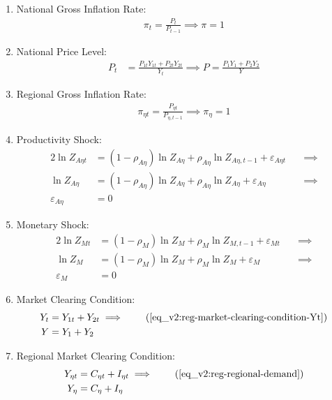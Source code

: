 \documentclass[../thesis.tex]{subfiles}
\begin{document}
\begin{enumerate}
	\item National Gross Inflation Rate:
	\begin{align}
		\pi_t = \frac{P_t}{P_{t-1}} \implies \pi = 1 \label{eq_v2:reg-ss-gross-inflation-rate}
	\end{align}
	
	\item National Price Level:
	\begin{align}
		P_t &= \frac{P_{1t} Y_{1t} + P_{2t} Y_{2t}}{Y_{t}} \implies P = \frac{P_{1} Y_{1} + P_{2} Y_{2}}{Y_{}} \label{eq_v2:ss-national-price-level} %
	\end{align}
	
	\item Regional Gross Inflation Rate:
	\begin{align}
		\pi_{\eta t} = \frac{P_{\eta t}}{P_{\eta, t-1}} \implies \pi_{\eta} = 1 \label{eq_v2:ss-regional-inflation}
	\end{align}
	
	\item Productivity Shock:
	\begin{alignat}{2}
		\ln{Z_{A\eta t}} &= (1 -\rho_{A\eta}) \ln{Z_{A\eta}} + \rho_{A\eta} \ln{Z_{A\eta,t-1}} + \varepsilon_{A\eta t} \quad &\implies \nonumber \\
		\ln{Z_{A\eta}} &= (1 -\rho_{A\eta}) \ln{Z_{A\eta}} + \rho_{A\eta} \ln{Z_{A\eta}} + \varepsilon_{A\eta} &\implies \nonumber \\
		\varepsilon_{A\eta} &= 0 \label{eq_v2:reg-ss-productivity-shock}
	\end{alignat}
	
	\item Monetary Shock:
	\begin{alignat}{2}
		\ln{Z_{Mt}} &= (1-\rho_M)\ln{Z_{M}} + \rho_M\ln{Z_{M,t-1}} + \varepsilon_{Mt} \quad &\implies \nonumber \\
		\ln{Z_{M}} &= (1-\rho_M)\ln{Z_{M}} + \rho_M\ln{Z_{M}} + \varepsilon_{M} &\implies \nonumber \\
		\varepsilon_{M} &= 0 \label{eq_v2:reg-ss-monetary-shock}
	\end{alignat}
	
	\item Market Clearing Condition:
	\begin{align}
		Y_{t} &= Y_{1 t} + Y_{2 t} \implies \tag{\ref{eq_v2:reg-market-clearing-condition-Yt}} \\
		Y &= Y_{1} + Y_{2} \label{eq_v2:reg-ss-market-clearing-condition}
	\end{align}
	
	\item Regional Market Clearing Condition:
	\begin{align}
		Y_{\eta t} &= C_{\eta t} + I_{\eta t} \implies \tag{\ref{eq_v2:reg-regional-demand}} \\
		Y_{\eta} &= C_{\eta} + I_{\eta} \label{eq_v2:reg-ss-total-yn}
	\end{align}
	
\end{enumerate}
\end{document}
